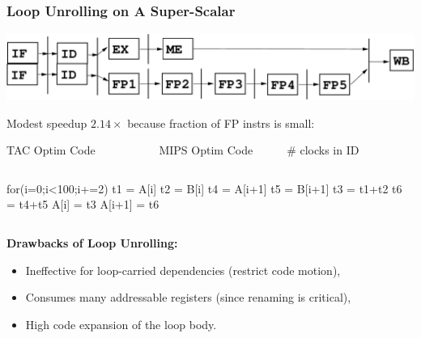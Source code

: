 \documentclass{beamer}
\renewcommand{\emph}[1]{\textcolor{structure}{#1}}
\newcommand{\emp}[1]{\textcolor{DikuRed}{ #1}}
\begin{document}
\begin{frame}[fragile,t]
    \frametitle{Loop Unrolling on A Super-Scalar}

\includegraphics[width=33ex]{Figures/SuperScalar}

Modest speedup $2.14\times$ because fraction of FP instrs is small:

\begin{block}{TAC Optim Code{\tt~~~~~~~~~~~}MIPS Optim Code~~~~~~\# clocks in ID}\vspace{-2ex}
\begin{columns}
\begin{colorcode}[fontsize=\scriptsize]
for(i=0;i<100;i+=2)
  t1 = \emph{A[i]}
  t2 = \emph{B[i]}
  t4 = \emph{A[i+1]}
  t5 = \emph{B[i+1]}
  t3 = t1+t2
  t6 = t4+t5
  \emp{A[i]} = t3
  \emp{A[i+1]} = t6
\end{colorcode}
\end{columns}
\end{block}
\smallskip

\emp{\bf Drawbacks of Loop Unrolling:}\pause
\begin{itemize}
    \item Ineffective for loop-carried dependencies (restrict code motion),
    \item Consumes many addressable registers (since renaming is critical),
    \item High code expansion of the loop body.
\end  {itemize}

\end{frame}
\end{document}
